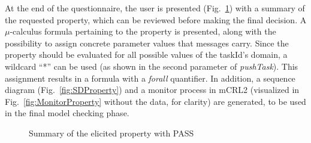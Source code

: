 \documentclass[letter]{llncs}
\begin{document}
At the end of the questionnaire, the user is presented (Fig.~\ref{fig:Summary}) with a summary of the requested property, which can be reviewed before making the final decision.
A $\mu$-calculus formula pertaining to the property is presented, along with the possibility to assign concrete parameter values that messages carry. 
Since the property should be evaluated for all possible values of the taskId's domain, a wildcard ``*'' can be used (as shown in the second parameter of \emph{pushTask}).
This assignment results in a formula with a \emph{forall} quantifier. In addition, a sequence diagram (Fig.~\ref{fig:SDProperty}) and a monitor process in mCRL2 (visualized in Fig.~\ref{fig:MonitorProperty} without the data, for clarity)  
are generated, to be used in the final model checking phase.
\begin{figure}[!t]
\centering
{%
\setlength{\fboxsep}{1.5pt}%
\setlength{\fboxrule}{0.5pt}%
%
}%
\caption{Summary of the elicited property with PASS}
\label{fig:Summary}
\end{figure}
\end{document}
